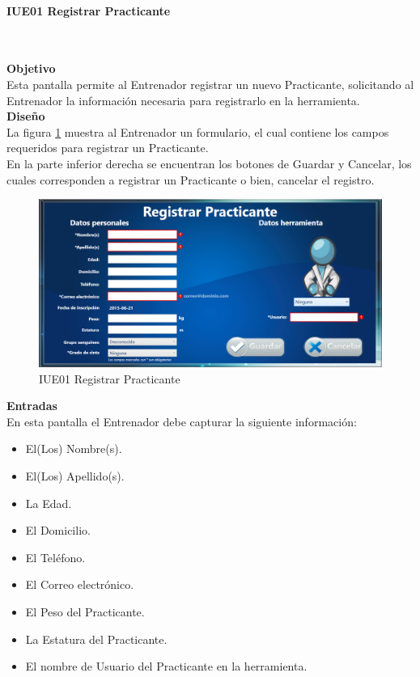 \paragraph{IUE01 Registrar Practicante} \hspace{1cm}\\ 
\label{pant:IUE01}

\textbf{\textcolor[rgb]{0, 0, 0.545098}{Objetivo}}\\
Esta pantalla permite al Entrenador registrar un nuevo Practicante, solicitando al Entrenador la información necesaria para registrarlo en la herramienta.\\

\textbf{\textcolor[rgb]{0, 0, 0.545098}{Diseño}}\\
La figura \ref{fig:IUE01} muestra al Entrenador un formulario, el cual contiene los campos requeridos para registrar un Practicante.\\

En la parte inferior derecha se encuentran los botones de Guardar y Cancelar, los cuales corresponden a registrar un Practicante o bien, cancelar el registro.

\begin{figure}[H]
	\centering
		\includegraphics[scale=0.5]{./Figuras/Pantallas/IUE01Registrar_Practicante}
	\caption{IUE01 Registrar Practicante}
	\label{fig:IUE01}
\end{figure}

\textbf{\textcolor[rgb]{0, 0, 0.545098}{Entradas}}\\
En esta pantalla el Entrenador debe capturar la siguiente información:

\begin{itemize}
	\item El(Los) Nombre(s).
	\item El(Los) Apellido(s).
	\item La Edad.
	\item El Domicilio.
	\item El Teléfono.
	\item El Correo electrónico.
	\item El Peso del Practicante.
	\item La Estatura del Practicante.
	\item El nombre de Usuario del Practicante en la herramienta.
\end{itemize}
\vspace{1em}


